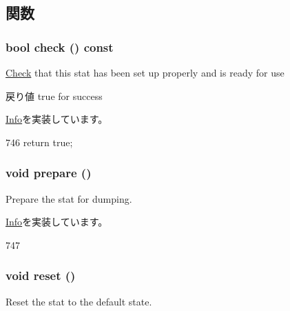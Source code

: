 \subsection{関数}
\hypertarget{classStats_1_1ProxyInfo_a6ecddb2c44556b7acbc1723a968ff8bb}{
\subsubsection[{check}]{\setlength{\rightskip}{0pt plus 5cm}bool check () const}}
\label{classStats_1_1ProxyInfo_a6ecddb2c44556b7acbc1723a968ff8bb}
\hyperlink{classCheck}{Check} that this stat has been set up properly and is ready for use \begin{DoxyReturn}{戻り値}
true for success 
\end{DoxyReturn}


\hyperlink{classStats_1_1Info_a8eeec53c51bc14f0ad0fe9e545a7a154}{Info}を実装しています。


\begin{DoxyCode}
746 { return true; }
\end{DoxyCode}
\hypertarget{classStats_1_1ProxyInfo_a1825b40ca3bc3a1ba67fdb58fac5015c}{
\subsubsection[{prepare}]{\setlength{\rightskip}{0pt plus 5cm}void prepare ()}}
\label{classStats_1_1ProxyInfo_a1825b40ca3bc3a1ba67fdb58fac5015c}
Prepare the stat for dumping. 

\hyperlink{classStats_1_1Info_a6516a60ee54e48d9e1f5565c0b8fda5a}{Info}を実装しています。


\begin{DoxyCode}
747 { }
\end{DoxyCode}
\hypertarget{classStats_1_1ProxyInfo_ad20897c5c8bd47f5d4005989bead0e55}{
\subsubsection[{reset}]{\setlength{\rightskip}{0pt plus 5cm}void reset ()}}
\label{classStats_1_1ProxyInfo_ad20897c5c8bd47f5d4005989bead0e55}
Reset the stat to the default state. 

